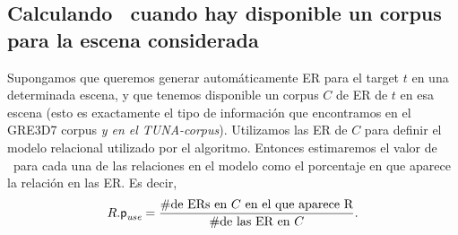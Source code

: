 \subsection{Calculando \puse\ cuando hay disponible un corpus para la escena considerada}





Supongamos que queremos generar autom\'aticamente ER para el target $t$ en una
determinada escena, y que tenemos disponible un corpus $C$ de ER de $t$
en esa escena (esto es exactamente el tipo de informaci\'on que encontramos en el
GRE3D7 corpus \textit{y en el TUNA-corpus}). Utilizamos las ER de $C$
para definir el modelo relacional utilizado por el algoritmo. Entonces 
estimaremos el valor de \puse\ para cada una de las relaciones en el modelo como el
porcentaje en que aparece la relaci\'on en las ER. Es decir,
\begin{equation} \label{eq1}
R.\textsf{p}_\textit{use} = \frac {\#\mbox{de ERs en $C$ en el que aparece R}} {\#\mbox{de las ER en $C$}}.
\end{equation}


